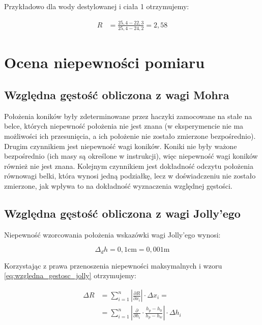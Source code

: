 \documentclass[a4paper,12pt]{article}
\begin{document}
Przykładowo dla wody destylowanej i ciała 1 otrzymujemy:

\begin{align*}
    R & = \frac{25{,}4 - 22{,}3}{25{,}4 - 24{,}2} = 2{,}58
\end{align*}


\section{Ocena niepewności pomiaru}

\subsection{Względna gęstość obliczona z wagi Mohra}

Położenia koników były zdeterminowane przez haczyki zamocowane na stałe na belce, których niepewność położenia nie jest znana (w eksperymencie nie ma możliwości ich przesunięcia, a ich położenie nie zostało zmierzone bezpośrednio). Drugim czynnikiem jest niepewność wagi koników. Koniki nie były ważone bezpośrednio (ich masy są określone w instrukcji), więc niepewność wagi koników również nie jest znana. Kolejnym czynnikiem jest dokładność odczytu położenia równowagi belki, która wynosi jedną podziałkę, lecz w doświadczeniu nie zostało zmierzone, jak wpływa to na dokładność wyznaczenia względnej gęstości.

\subsection{Względna gęstość obliczona z wagi Jolly'ego}

Niepewność wzorcowania położenia wskazówki wagi Jolly'ego wynosi:

\begin{equation*}
    \Delta_d h = 0{,}1 \text{cm} = 0{,}001 \text{m}
\end{equation*}

Korzystając z prawa przenoszenia niepewności maksymalnych i wzoru \eqref{eq:wzgledna_gestosc_jolly} otrzymujemy:

\begin{align*}
    \Delta R & = \sum_{i=1}^{n} \left | \frac{\partial R}{\partial x_i} \right | \cdot \Delta x_i =                               \\
             & = \sum_{i=1}^{n} \left | \frac{\partial}{\partial h_i} \cdot \frac{h_p - h_0}{h_p - h_w} \right | \cdot \Delta h_i
\end{align*}
\end{document}
